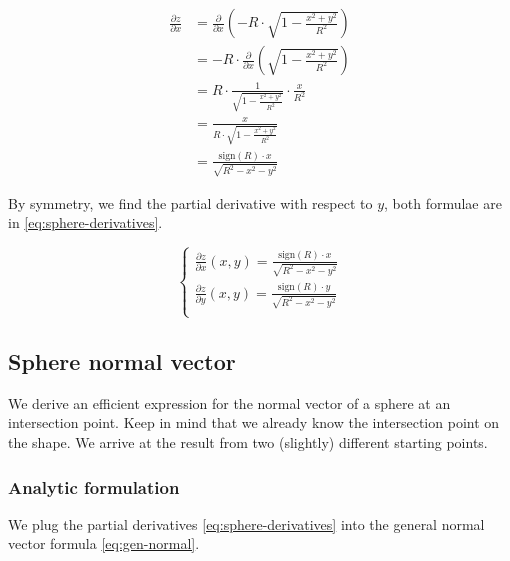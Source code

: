 \begin{equation} \begin{split}
\frac{\partial z}{\partial x} & = 
\frac{\partial}{\partial x}
\left( -R \cdot \sqrt{1 - \frac{x^2 + y^2}{R^2}} \right) \\
& = - R \cdot \frac{\partial}{\partial x}
\left( \sqrt{1 - \frac{x^2 + y^2}{R^2}} \right) \\
& = R \cdot \frac{1}{\sqrt{1 - \frac{x^2 + y^2}{R^2}}} \cdot
\frac{x}{R^2} \\
& = \frac{x}{R \cdot \sqrt{1 - \frac{x^2 + y^2}{R^2}}} \\
& = \frac{\textrm{sign}(R) \cdot x}{\sqrt{R^2 - x^2 -y^2}}
\end{split} \end{equation}

By symmetry, we find the partial derivative with respect to $y$, both
formulae are in \cref{eq:sphere-derivatives}.

\begin{equation} \label{eq:sphere-derivatives} \begin{cases}
\frac{\partial z}{\partial x} (x, y) =
\frac{\textrm{sign}(R) \cdot x}{\sqrt{R^2 - x^2 -y^2}} \\
\frac{\partial z}{\partial y} (x, y) =
\frac{\textrm{sign}(R) \cdot y}{\sqrt{R^2 - x^2 -y^2}} \\
\end{cases} \end{equation}

\subsection{Sphere normal vector}
We derive an efficient expression for the normal vector of a sphere at
an intersection point. Keep in mind that we already know the intersection
point on the shape. We arrive at the result from two (slightly) different
starting points.

\subsubsection{Analytic formulation}
We plug the partial derivatives \cref{eq:sphere-derivatives} into the general
normal vector formula \cref{eq:gen-normal}.

